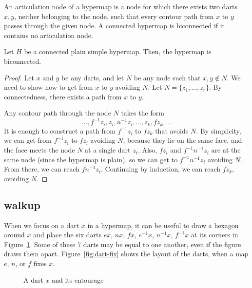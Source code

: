 \begin{definition}[biconnected]
An articulation node of a hypermap is a node for which
there exists two darts $x,y$, 
neither belonging to the node,
such that every contour path from $x$ to $y$ passes
through the given node.
A connected hypermap is biconnected
if it contains no articulation node.  
\end{definition}

\begin{lemma} Let $H$ be a connected plain simple hypermap. Then, the hypermap is biconnected.
\end{lemma}

\begin{proof} Let $x$ and $y$ be any darts, and let $N$ be any node such that $x,y\not\in N$.  We need to show how to get from $x$ to $y$ avoiding $N$.  Let $N = \{z_1,\ldots,z_r\}$.  By connectedness, there exists a path from $x$ to $y$.

Any contour path through the node $N$ takes the form 
$$
\ldots, f^{-1} z_i, z_i, n^{-1} z_i,\ldots, z_k, f z_k,\ldots
$$
It is enough to construct a path from $f^{-1} z_i$ to $f z_k$ that avoids $N$. By simplicity, we can get from $f^{-1} z_i$ to $f z_i$ avoiding $N$, because they lie on the same face, and the face meets the node $N$ at a single dart $z_i$.  Also, $f z_i$ and $f^{-1} n^{-1} z_i$ are at the same node (since the hypermap is plain), so we can get to $f^{-1} n^{-1} z_i$ avoiding $N$.  From there, we can reach $f n^{-1} z_i$.  Continuing by induction, we can reach $f z_k$, avoiding $N$.
\end{proof}


\subsection{walkup}

When we focus on a dart $x$ in a
hypermap, it can be useful to draw a hexagon around $x$ and place
the six darts $e x$,
$n x$, $f x$, $e^{-1} x$, $n^{-1} x$, $f^{-1} x$ at its corners
in Figure~\ref{fig:dart+}.  Some of these $7$ darts may be
equal to one another, even if the figure draws them apart.
Figure~\ref{fig:dart-fix} shows the layout of the darts, when 
a map $e$, $n$, or $f$ fixes $x$.

\begin{figure}[htb]
  \centering
  \caption{A dart $x$ and its entourage}
  \label{fig:dart+}
\end{figure}

